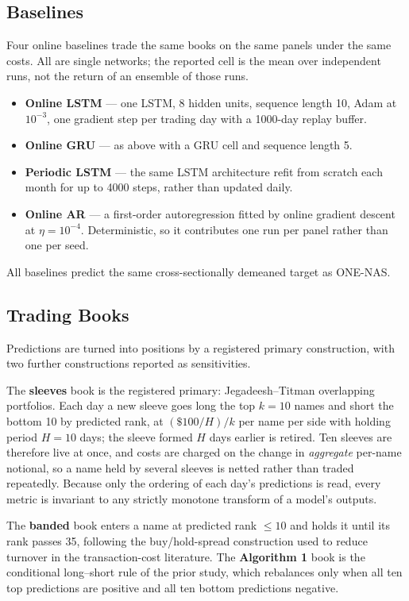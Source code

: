 \subsection{Baselines}

Four online baselines trade the same books on the same panels under the
same costs. All are single networks; the reported cell is the mean over
independent runs, not the return of an ensemble of those runs.

\begin{itemize}\itemsep2pt
\item \textbf{Online LSTM} --- one LSTM, 8 hidden units, sequence length
      10, Adam at $10^{-3}$, one gradient step per trading day with a
      1000-day replay buffer.
\item \textbf{Online GRU} --- as above with a GRU cell and sequence
      length 5.
\item \textbf{Periodic LSTM} --- the same LSTM architecture refit from
      scratch each month for up to 4000 steps, rather than updated daily.
\item \textbf{Online AR} --- a first-order autoregression fitted by online
      gradient descent at $\eta=10^{-4}$. Deterministic, so it contributes
      one run per panel rather than one per seed.
\end{itemize}

All baselines predict the same cross-sectionally demeaned target as
ONE-NAS.

\subsection{Trading Books}

Predictions are turned into positions by a registered primary
construction, with two further constructions reported as sensitivities.

The \textbf{sleeves} book is the registered primary: Jegadeesh--Titman
overlapping portfolios. Each day a new sleeve goes long the top
$k=10$ names and short the bottom 10 by predicted rank, at
$(\$100/H)/k$ per name per side with holding period $H=10$ days; the
sleeve formed $H$ days earlier is retired. Ten sleeves are therefore live
at once, and costs are charged on the change in \emph{aggregate} per-name
notional, so a name held by several sleeves is netted rather than traded
repeatedly. Because only the ordering of each day's predictions is read,
every metric is invariant to any strictly monotone transform of a model's
outputs.

The \textbf{banded} book enters a name at predicted rank $\le 10$ and
holds it until its rank passes 35, following the buy/hold-spread
construction used to reduce turnover in the transaction-cost literature.
The \textbf{Algorithm 1} book is the conditional long--short rule of the
prior study, which rebalances only when all ten top predictions are
positive and all ten bottom predictions negative.

